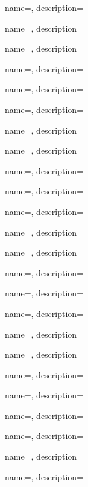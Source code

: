 {
  name={\PLph},
  description={\PLph}
}

{
  name={\PLph},
  description={\PLph}
}

{
  name={\PLph},
  description={\PLph}
}

{
  name={\PLph},
  description={\PLph}
}

{
  name={\PLph},
  description={\PLph}
}

{
  name={\PLph},
  description={\PLph}
}

{
  name={\PLph},
  description={\PLph}
}

{
  name={\PLph},
  description={\PLph}
}

{
  name={\PLph},
  description={\PLph}
}

{
  name={\PLph},
  description={\PLph}
}

{
  name={\PLph},
  description={\PLph}
}

{
  name={\PLph},
  description={\PLph}
}

{
  name={\PLph},
  description={\PLph}
}

{
  name={\PLph},
  description={\PLph}
}

{
  name={\PLph},
  description={\PLph}
}

{
  name={\PLph},
  description={\PLph}
}

{
  name={\PLph},
  description={\PLph}
}

{
  name={\PLph},
  description={\PLph}
} 

{
  name={\PLph},
  description={\PLph}
}

{
  name={\PLph},
  description={\PLph}
}

{
  name={\PLph},
  description={\PLph}
}

{
  name={\PLph},
  description={\PLph}
}

{
  name={\PLph},
  description={\PLph}
}

{
  name={\PLph},
  description={\PLph}
}

